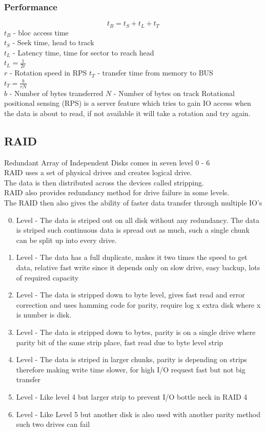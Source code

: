 \documentclass[12pt, a4paper]{article}
\begin{document}
			\subsubsection{Performance}
				$$t_B=t_S+t_L+t_T$$
				$t_B$ - bloc access time\\
				$t_S$ - Seek time, head to track\\
				$t_L$ - Latency time, time for sector to reach head\\
				$t_L=\frac{1}{2r}$ \\
				$r$ - Rotation speed in RPS
				$t_T$ - transfer time from memory to BUS\\
				$t_T=\frac{b}{rN}$\\
				$b$ - Number of bytes transferred
				$N$ - Number of bytes on track
				Rotational positional sensing (RPS) is a server feature which tries to gain IO access when the data is about to read, if not available it will take a rotation and try again.\\
		\subsection{RAID}
			Redundant Array of Independent Disks comes in seven level 0 - 6\\
			RAID uses a set of physical drives and creates logical drive.\\
			The data is then distributed across the devices called stripping.\\
			RAID also provides redundancy method for drive failure in some levels.\\
			The RAID then also gives the ability of faster data transfer through multiple IO's\\
			\begin{enumerate}
 				\setcounter{enumi}{-1}
 				\item Level - The data is striped out on all disk without any redundancy. The data is striped such continuous data is spread out as much, such a single chunk can be split up into every drive.
 				\item Level - The data has a full duplicate, makes it two times the speed to get data, relative fast write since it depends only on slow drive, easy backup, lots of required capacity
 				\item Level - The data is stripped down to byte level, gives fast read and error correction and uses hamming code for parity, require log x extra disk where x is number is disk.
 				\item Level - The data is stripped down to bytes, parity is on a single drive where parity bit of the same strip place, fast read due to byte level strip
 				\item Level - The data is striped in larger chunks, parity is depending on strips therefore making write time slower, for high I/O request fast but not big transfer
 				\item Level - Like level 4 but larger strip to prevent I/O bottle neck in RAID 4
 				\item Level - Like Level 5 but another disk is also used with another parity method such two drives can fail
			\end{enumerate}
\end{document}

